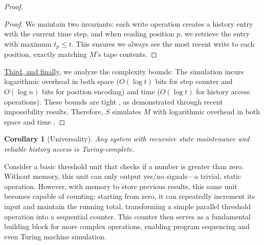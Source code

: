 \documentclass[12pt]{article}
\newtheorem{corollary}[theorem]{Corollary}
\begin{document}
\begin{proof}
\begin{proof}
We maintain two invariants: each write operation creates a history entry with the current time step, and when reading position $p$, we retrieve the entry with maximum $t_p \leq t$.
This ensures we always see the most recent write to each position, exactly matching $M$'s tape contents.
\end{proof}

\vspace{0.5em}
\noindent\underline{Third, and finally}, we analyze the complexity bounds: The simulation incurs logarithmic overhead in both space ($O(\log t)$ bits for step counter and $O(\log n)$ bits for position encoding) and time ($O(\log t)$ for history access operations). These bounds are tight \cite{parzych2024memory,hhan2024new,boyle2024memory}, as demonstrated through recent impossibility results. Therefore, $S$ simulates $M$ with logarithmic overhead in both space and time \cite{savage1994space,vonkorff2019molecular,bennett1989time}.
\end{proof}

\begin{corollary}[Universality]
Any system with recursive state maintenance and reliable history access is Turing-complete.
\end{corollary}

\vspace{1em}

Consider a basic threshold unit that checks if a number is greater than zero.
Without memory, this unit can only output yes/no signals---a trivial, static operation.
However, with memory to store previous results, this same unit becomes capable of counting: starting from zero, it can repeatedly increment its input and maintain the running total, transforming a simple parallel threshold operation into a sequential counter.
This counter then serves as a fundamental building block for more complex operations, enabling program sequencing and even Turing machine simulation.
\end{document}
